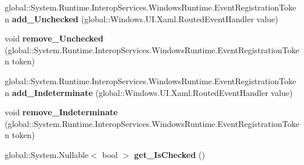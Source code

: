 \begin{DoxyCompactItemize}
\item 
\mbox{\label{interface_windows_1_1_u_i_1_1_xaml_1_1_controls_1_1_primitives_1_1_i_toggle_button_af2a52e0a9086bccd03127ee7044692ab}} 
global\+::\+System.\+Runtime.\+Interop\+Services.\+Windows\+Runtime.\+Event\+Registration\+Token {\bfseries add\+\_\+\+Unchecked} (global\+::\+Windows.\+U\+I.\+Xaml.\+Routed\+Event\+Handler value)
\item 
\mbox{\label{interface_windows_1_1_u_i_1_1_xaml_1_1_controls_1_1_primitives_1_1_i_toggle_button_a4828a2c0dc3818cf5b0a8b6f35fbd268}} 
void {\bfseries remove\+\_\+\+Unchecked} (global\+::\+System.\+Runtime.\+Interop\+Services.\+Windows\+Runtime.\+Event\+Registration\+Token token)
\item 
\mbox{\label{interface_windows_1_1_u_i_1_1_xaml_1_1_controls_1_1_primitives_1_1_i_toggle_button_aa819460ff16c0555139f41a6ff334a9b}} 
global\+::\+System.\+Runtime.\+Interop\+Services.\+Windows\+Runtime.\+Event\+Registration\+Token {\bfseries add\+\_\+\+Indeterminate} (global\+::\+Windows.\+U\+I.\+Xaml.\+Routed\+Event\+Handler value)
\item 
\mbox{\label{interface_windows_1_1_u_i_1_1_xaml_1_1_controls_1_1_primitives_1_1_i_toggle_button_ab448af06ccc5e4eaca742a2ef9c88b2b}} 
void {\bfseries remove\+\_\+\+Indeterminate} (global\+::\+System.\+Runtime.\+Interop\+Services.\+Windows\+Runtime.\+Event\+Registration\+Token token)
\item 
\mbox{\label{interface_windows_1_1_u_i_1_1_xaml_1_1_controls_1_1_primitives_1_1_i_toggle_button_ab2f2c05633de2713aaa610f12657e543}} 
global\+::\+System.\+Nullable$<$ bool $>$ {\bfseries get\+\_\+\+Is\+Checked} ()
\item 
\mbox{\label{interface_windows_1_1_u_i_1_1_xaml_1_1_controls_1_1_primitives_1_1_i_toggle_button_afaace15befe9dea02eb0d81c76b8ff32}} 

\end{DoxyCompactItemize}
